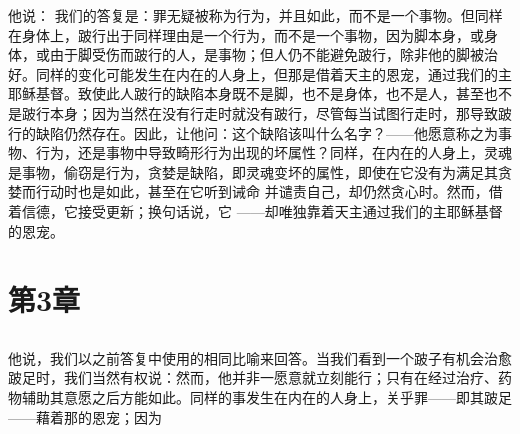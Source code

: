 他说： 我们的答复是：罪无疑被称为行为，并且如此，而不是一个事物。但同样在身体上，跛行出于同样理由是一个行为，而不是一个事物，因为脚本身，或身体，或由于脚受伤而跛行的人，是事物；但人仍不能避免跛行，除非他的脚被治好。同样的变化可能发生在内在的人身上，但那是借着天主的恩宠，通过我们的主耶稣基督。致使此人跛行的缺陷本身既不是脚，也不是身体，也不是人，甚至也不是跛行本身；因为当然在没有行走时就没有跛行，尽管每当试图行走时，那导致跛行的缺陷仍然存在。因此，让他问：这个缺陷该叫什么名字？——他愿意称之为事物、行为，还是事物中导致畸形行为出现的坏属性？同样，在内在的人身上，灵魂是事物，偷窃是行为，贪婪是缺陷，即灵魂变坏的属性，即使在它没有为满足其贪婪而行动时也是如此，甚至在它听到诫命  并谴责自己，却仍然贪心时。然而，借着信德，它接受更新；换句话说，它  ——却唯独靠着天主通过我们的主耶稣基督的恩宠。\par


\section{第3章}


\subsection{}

他说，我们以之前答复中使用的相同比喻来回答。当我们看到一个跛子有机会治愈跛足时，我们当然有权说：然而，他并非一愿意就立刻能行；只有在经过治疗、药物辅助其意愿之后方能如此。同样的事发生在内在的人身上，关乎罪——即其跛足——藉着那的恩宠；因为\par

